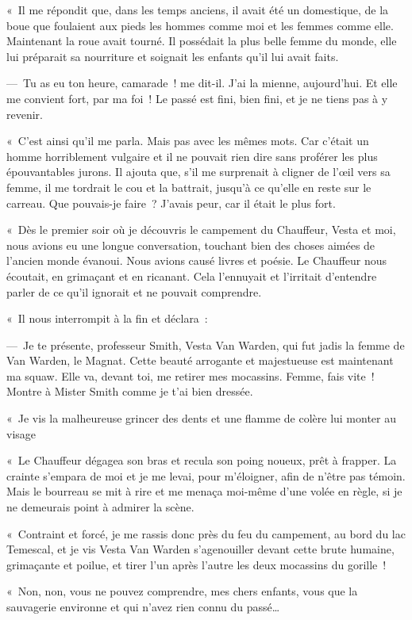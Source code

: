 \documentclass[french,twoside]{book} %
\begin{document}
« Il me répondit que, dans les temps anciens, il avait été un domestique, de la boue que foulaient aux pieds les hommes comme moi et les femmes comme elle. Maintenant la roue avait tourné. Il possédait la plus belle femme du monde, elle lui préparait sa nourriture et soignait les enfants qu’il lui avait faits.\par
— Tu as eu ton heure, camarade ! me dit-il. J’ai la mienne, aujourd’hui. Et elle me convient fort, par ma foi ! Le passé est fini, bien fini, et je ne tiens pas à y revenir.\par
« C’est ainsi qu’il me parla. Mais pas avec les mêmes mots. Car c’était un homme horriblement vulgaire et il ne pouvait rien dire sans proférer les plus épouvantables jurons. Il ajouta que, s’il me surprenait à cligner de l’œil vers sa femme, il me tordrait le cou et la battrait, jusqu’à ce qu’elle en reste sur le carreau. Que pouvais-je faire ? J’avais peur, car il était le plus fort.\par
« Dès le premier soir où je découvris le campement du Chauffeur, Vesta et moi, nous avions eu une longue conversation, touchant bien des choses aimées de l’ancien monde évanoui. Nous avions causé livres et poésie. Le Chauffeur nous écoutait, en grimaçant et en ricanant. Cela l’ennuyait et l’irritait d’entendre parler de ce qu’il ignorait et ne pouvait comprendre.\par
« Il nous interrompit à la fin et déclara :\par
— Je te présente, professeur Smith, Vesta Van Warden, qui fut jadis la femme de Van Warden, le Magnat. Cette beauté arrogante et majestueuse est maintenant ma squaw. Elle va, devant toi, me retirer mes mocassins. Femme, fais vite ! Montre à Mister Smith comme je t’ai bien dressée.\par
« Je vis la malheureuse grincer des dents et une flamme de colère lui monter au visage\par
« Le Chauffeur dégagea son bras et recula son poing noueux, prêt à frapper. La crainte s’empara de moi et je me levai, pour m’éloigner, afin de n’être pas témoin. Mais le bourreau se mit à rire et me menaça moi-même d’une volée en règle, si je ne demeurais point à admirer la scène.\par
« Contraint et forcé, je me rassis donc près du feu du campement, au bord du lac Temescal, et je vis Vesta Van Warden s’agenouiller devant cette brute humaine, grimaçante et poilue, et tirer l’un après l’autre les deux mocassins du gorille !\par
« Non, non, vous ne pouvez comprendre, mes chers enfants, vous que la sauvagerie environne et qui n’avez rien connu du passé…\par
\end{document}
